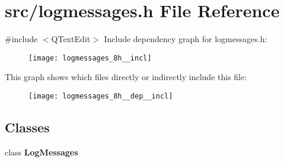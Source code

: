 \section{src/logmessages.h File Reference}
\label{logmessages_8h}
{\ttfamily \#include $<$Q\+Text\+Edit$>$}\newline
Include dependency graph for logmessages.\+h\+:\nopagebreak
\begin{figure}[H]
\begin{center}
\leavevmode
\texttt{[image: logmessages\_8h\_\_incl]}
\end{center}
\end{figure}
This graph shows which files directly or indirectly include this file\+:\nopagebreak
\begin{figure}[H]
\begin{center}
\leavevmode
\texttt{[image: logmessages\_8h\_\_dep\_\_incl]}
\end{center}
\end{figure}
\subsection*{Classes}
\begin{DoxyCompactItemize}
\item 
class \textbf{ Log\+Messages}
\end{DoxyCompactItemize}

